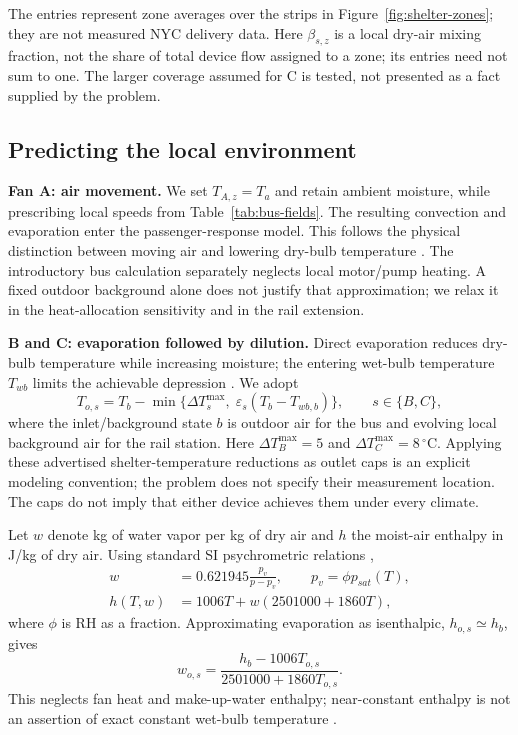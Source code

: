 \documentclass[12pt]{article}
\begin{document}
The entries represent zone averages over the strips in Figure~\ref{fig:shelter-zones}; they are not measured NYC delivery data. Here $\beta_{s,z}$ is a local dry-air mixing fraction, not the share of total device flow assigned to a zone; its entries need not sum to one. The larger coverage assumed for C is tested, not presented as a fact supplied by the problem.

\subsection{Predicting the local environment}

\noindent\textbf{Fan A: air movement.} We set $T_{A,z}=T_a$ and retain ambient moisture, while prescribing local speeds from Table~\ref{tab:bus-fields}. The resulting convection and evaporation enter the passenger-response model. This follows the physical distinction between moving air and lowering dry-bulb temperature \cite{fanguide}. The introductory bus calculation separately neglects local motor/pump heating. A fixed outdoor background alone does not justify that approximation; we relax it in the heat-allocation sensitivity and in the rail extension.

\noindent\textbf{B and C: evaporation followed by dilution.} Direct evaporation reduces dry-bulb temperature while increasing moisture; the entering wet-bulb temperature $T_{wb}$ limits the achievable depression \cite{evapequip}. We adopt
\begin{equation}
 T_{o,s}=T_b-\min\{\Delta T_s^{\max},\;\varepsilon_s(T_b-T_{wb,b})\},
 \qquad s\in\{B,C\},
\label{eq:outlet}
\end{equation}
where the inlet/background state $b$ is outdoor air for the bus and evolving local background air for the rail station. Here $\Delta T_B^{\max}=5$ and $\Delta T_C^{\max}=8\,^{\circ}\mathrm C$. Applying these advertised shelter-temperature reductions as outlet caps is an explicit modeling convention; the problem does not specify their measurement location. The caps do not imply that either device achieves them under every climate.

Let $w$ denote kg of water vapor per kg of dry air and $h$ the moist-air enthalpy in J/kg of dry air. Using standard SI psychrometric relations \cite{psychrolib},
\begin{align}
 w&=0.621945\frac{p_v}{p-p_v},\qquad p_v=\phi p_{sat}(T),\\
 h(T,w)&=1006T+w(2501000+1860T),
\label{eq:enthalpy}
\end{align}
where $\phi$ is RH as a fraction. Approximating evaporation as isenthalpic, $h_{o,s}\simeq h_b$, gives
\begin{equation}
 w_{o,s}=\frac{h_b-1006T_{o,s}}{2501000+1860T_{o,s}}.
\end{equation}
This neglects fan heat and make-up-water enthalpy; near-constant enthalpy is not an assertion of exact constant wet-bulb temperature \cite{evap}.
\end{document}
